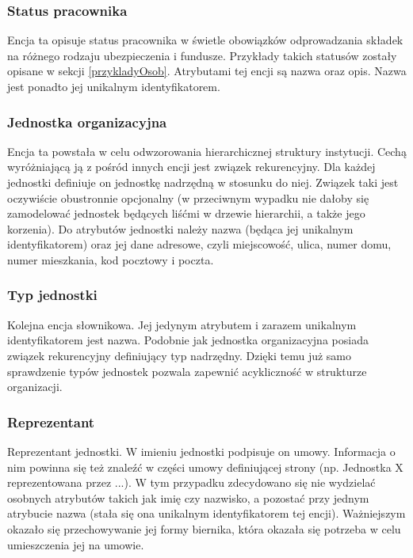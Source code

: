 \subsubsection{Status pracownika}
Encja ta opisuje status pracownika w świetle obowiązków odprowadzania składek na różnego rodzaju ubezpieczenia i fundusze. Przykłady takich statusów zostały opisane w sekcji \ref{przykladyOsob}. Atrybutami tej encji są nazwa oraz opis. Nazwa jest ponadto jej unikalnym identyfikatorem.

\subsubsection{Jednostka organizacyjna}
Encja ta powstała w celu odwzorowania hierarchicznej struktury instytucji. Cechą wyróżniającą ją z pośród innych encji jest związek rekurencyjny. Dla każdej jednostki definiuje on jednostkę nadrzędną w stosunku do niej. Związek taki jest oczywiście obustronnie opcjonalny (w przeciwnym wypadku nie dałoby się zamodelować jednostek będących liśćmi w drzewie hierarchii, a także jego korzenia). Do atrybutów jednostki należy nazwa (będąca jej unikalnym identyfikatorem) oraz jej dane adresowe, czyli miejscowość, ulica, numer domu, numer mieszkania, kod pocztowy i poczta.

\subsubsection{Typ jednostki}
Kolejna encja słownikowa. Jej jedynym atrybutem i zarazem unikalnym identyfikatorem jest nazwa. Podobnie jak jednostka organizacyjna posiada związek rekurencyjny definiujący typ nadrzędny. Dzięki temu już samo sprawdzenie typów jednostek pozwala zapewnić acykliczność w strukturze organizacji.

\subsubsection{Reprezentant}
Reprezentant jednostki. W imieniu jednostki podpisuje on umowy. Informacja o nim powinna się też znaleźć w części umowy definiującej strony  (np. Jednostka X reprezentowana przez ...). W tym przypadku zdecydowano się nie wydzielać osobnych atrybutów takich jak imię czy nazwisko, a pozostać przy jednym atrybucie nazwa (stała się ona unikalnym identyfikatorem tej encji). Ważniejszym okazało się przechowywanie jej formy biernika, która okazała się potrzeba w celu umieszczenia jej na umowie.

